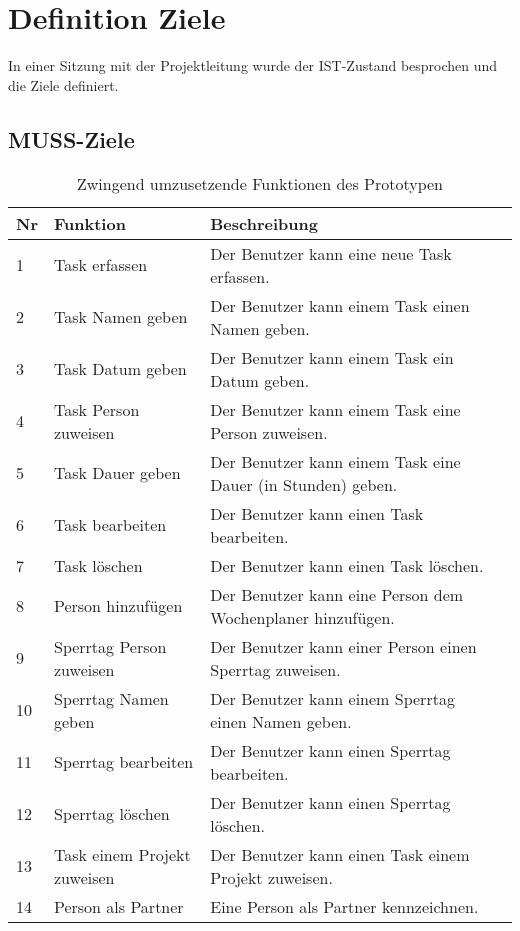 \section{Definition Ziele}
In einer Sitzung mit der Projektleitung wurde der IST-Zustand besprochen und die Ziele definiert.

\subsection{MUSS-Ziele}
\begin{table}[!ht]
\begin{center}
    \begin{tabular}{llp{8cm}l}
        \toprule Nr & Funktion & Beschreibung \\
        \midrule 1 & Task erfassen & Der Benutzer kann eine neue Task erfassen. \\
        \midrule 2 & Task Namen geben & Der Benutzer kann einem Task einen Namen geben. \\
        \midrule 3 & Task Datum geben & Der Benutzer kann einem Task ein Datum geben. \\
        \midrule 4 & Task Person zuweisen & Der Benutzer kann einem Task eine Person zuweisen. \\
        \midrule 5 & Task Dauer geben & Der Benutzer kann einem Task eine Dauer (in Stunden) geben. \\
        \midrule 6 & Task bearbeiten & Der Benutzer kann einen Task bearbeiten. \\ 
        \midrule 7 & Task löschen & Der Benutzer kann einen Task löschen. \\
        \midrule 8 & Person hinzufügen & Der Benutzer kann eine Person dem Wochenplaner hinzufügen. \\
        \midrule 9 & Sperrtag Person zuweisen & Der Benutzer kann einer Person einen Sperrtag zuweisen. \\
        \midrule 10 & Sperrtag Namen geben & Der Benutzer kann einem Sperrtag einen Namen geben. \\
        \midrule 11 & Sperrtag bearbeiten & Der Benutzer kann einen Sperrtag bearbeiten.\\
        \midrule 12 & Sperrtag löschen & Der Benutzer kann einen Sperrtag löschen.\\
        \midrule 13 & Task einem Projekt zuweisen & Der Benutzer kann einen Task einem Projekt zuweisen.\\
        \midrule 14 & Person als Partner & Eine Person als Partner kennzeichnen.\\
        \bottomrule
    \end{tabular}
    \caption{Zwingend umzusetzende Funktionen des Prototypen}
    \label{tab:muss_funktionen}
\end{center}
\end{table}
